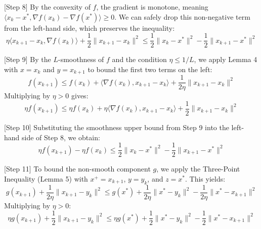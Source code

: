 \documentclass{article}
\begin{document}
[Step 8] By the convexity of $f$, the gradient is monotone, meaning $\langle x_k - x^*, \nabla f(x_k) - \nabla f(x^*) \rangle \geq 0$. We can safely drop this non-negative term from the left-hand side, which preserves the inequality:
\begin{equation}
\eta \langle x_{k+1} - x_k, \nabla f(x_k) \rangle + \frac{1}{2} \|x_{k+1} - x_k\|^2 \leq \frac{1}{2} \|x_k - x^*\|^2 - \frac{1}{2} \|x_{k+1} - x^*\|^2
\end{equation}

[Step 9] By the $L$-smoothness of $f$ and the condition $\eta \leq 1/L$, we apply Lemma 4 with $x = x_k$ and $y = x_{k+1}$ to bound the first two terms on the left:
\begin{equation}
f(x_{k+1}) \leq f(x_k) + \langle \nabla f(x_k), x_{k+1} - x_k \rangle + \frac{1}{2\eta} \|x_{k+1} - x_k\|^2
\end{equation}
Multiplying by $\eta > 0$ gives:
\begin{equation}
\eta f(x_{k+1}) \leq \eta f(x_k) + \eta \langle \nabla f(x_k), x_{k+1} - x_k \rangle + \frac{1}{2} \|x_{k+1} - x_k\|^2
\end{equation}

[Step 10] Substituting the smoothness upper bound from Step 9 into the left-hand side of Step 8, we obtain:
\begin{equation}
\eta f(x_{k+1}) - \eta f(x_k) \leq \frac{1}{2} \|x_k - x^*\|^2 - \frac{1}{2} \|x_{k+1} - x^*\|^2
\end{equation}

[Step 11] To bound the non-smooth component $g$, we apply the Three-Point Inequality (Lemma 5) with $x^+ = x_{k+1}$, $y = y_k$, and $z = x^*$. This yields:
\begin{equation}
g(x_{k+1}) + \frac{1}{2\eta}\|x_{k+1} - y_k\|^2 \leq g(x^*) + \frac{1}{2\eta}\|x^* - y_k\|^2 - \frac{1}{2\eta}\|x^* - x_{k+1}\|^2
\end{equation}
Multiplying by $\eta > 0$:
\begin{equation}
\eta g(x_{k+1}) + \frac{1}{2}\|x_{k+1} - y_k\|^2 \leq \eta g(x^*) + \frac{1}{2}\|x^* - y_k\|^2 - \frac{1}{2}\|x^* - x_{k+1}\|^2
\end{equation}
\end{document}
